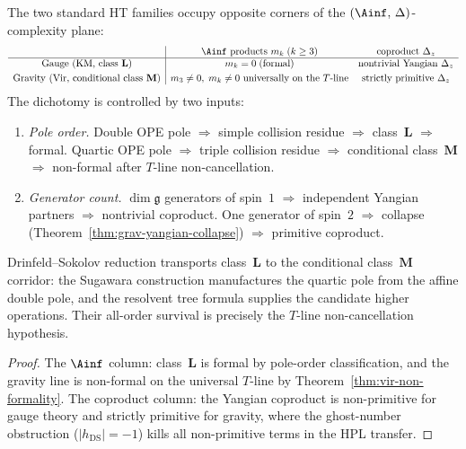 \begin{corollary}
\label{cor:gauge-gravity-dichotomy-ordered}
The two standard HT families occupy opposite corners of the
$(\Ainf,\,\Delta)$-complexity plane:
\[
\begin{array}{c|cc}
& \Ainf\textup{ products } m_k\;(k \ge 3) &
 \textup{coproduct } \Delta_z \\
\hline
\textup{Gauge \textup{(}KM, class~$\mathbf{L}$\textup{)}}
 & m_k = 0\;\textup{(formal)}
 & \textup{nontrivial Yangian } \Delta_z \\[3pt]
\textup{Gravity \textup{(}Vir, conditional class~$\mathbf{M}$\textup{)}}
 & m_3\neq0,\;m_k\neq0\ \textup{universally on the }T\textup{-line}
 & \textup{strictly primitive } \Delta_z
\end{array}
\]
The dichotomy is controlled by two inputs:
\begin{enumerate}[label=\textup{(\arabic*)}]
\item \emph{Pole order.}\enspace
Double OPE pole $\Rightarrow$ simple collision residue
$\Rightarrow$ class~$\mathbf{L}$ $\Rightarrow$ formal.
Quartic OPE pole $\Rightarrow$ triple collision residue
$\Rightarrow$ conditional class~$\mathbf{M}$ $\Rightarrow$
non-formal after $T$-line non-cancellation.

\item \emph{Generator count.}\enspace
$\dim\mathfrak{g}$ generators of spin~$1$
$\Rightarrow$ independent Yangian partners
$\Rightarrow$ nontrivial coproduct.
One generator of spin~$2$
$\Rightarrow$ collapse
\textup{(}Theorem~\textup{\ref{thm:grav-yangian-collapse})}
$\Rightarrow$ primitive coproduct.
\end{enumerate}
Drinfeld--Sokolov reduction transports class~$\mathbf{L}$ to
the conditional class~$\mathbf{M}$ corridor: the Sugawara construction
manufactures the quartic pole from the affine double pole, and the
resolvent tree formula supplies the candidate higher operations. Their
all-order survival is precisely the $T$-line non-cancellation
hypothesis.
\end{corollary}

\begin{proof}
The $\Ainf$ column: class~$\mathbf{L}$ is formal by pole-order
classification, and the gravity line is non-formal on the universal
$T$-line by Theorem~\ref{thm:vir-non-formality}. The coproduct column:
the
Yangian coproduct is non-primitive for gauge theory and strictly
primitive for gravity, where the ghost-number obstruction
($|h_{\mathrm{DS}}| = -1$) kills all non-primitive terms in
the HPL transfer.
\end{proof}

